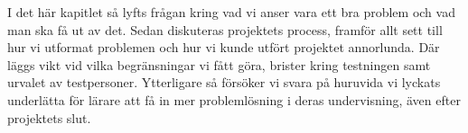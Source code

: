 \textcolor{Mahogany}{
    I det här kapitlet så lyfts frågan kring vad vi anser vara ett bra problem och vad man ska få ut av det. Sedan diskuteras projektets process, framför allt sett till hur vi utformat problemen och hur vi kunde utfört projektet annorlunda. Där läggs vikt vid vilka begränsningar vi fått göra, brister kring testningen samt urvalet av testpersoner.
    Ytterligare så försöker vi svara på huruvida vi lyckats underlätta för lärare att få in mer problemlösning i deras undervisning, även efter projektets slut.
}